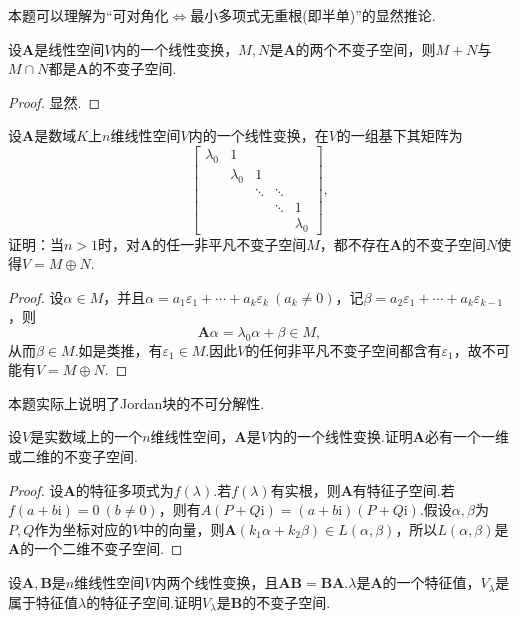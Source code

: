 \begin{note}
	本题可以理解为“可对角化$\Leftrightarrow$最小多项式无重根(即半单)”的显然推论.
\end{note}
\begin{prob}[15]
	设$\bm A$是线性空间$V$内的一个线性变换，$M,N$是$\bm A$的两个不变子空间，则$M+N$与$M\cap N$都是$\bm A$的不变子空间.
\end{prob}
\begin{proof}
	显然.
\end{proof}
\begin{prob}[16]
	设$\bm A$是数域$K$上$n$维线性空间$V$内的一个线性变换，在$V$的一组基下其矩阵为
	\[
		\begin{bmatrix}
			\lambda_0 & 1         &        &        &           \\
			          & \lambda_0 & 1      &        &           \\
			          &           & \ddots & \ddots &           \\
			          &           &        & \ddots & 1         \\
			          &           &        &        & \lambda_0
		\end{bmatrix},
	\]
	证明：当$n>1$时，对$\bm A$的任一非平凡不变子空间$M$，都不存在$\bm A$的不变子空间$N$使得$V=M\oplus N$.
\end{prob}
\begin{proof}
	设$\alpha\in M$，并且$\alpha=a_1\varepsilon_1+\cdots+a_k\varepsilon_k\ (a_k\ne0)$，记$\beta=a_2\varepsilon_1+\cdots+a_k\varepsilon_{k-1}$，则
	\[
		\bm A\alpha=\lambda_0\alpha+\beta\in M,
	\]
	从而$\beta\in M$.如是类推，有$\varepsilon_1\in M$.因此$V$的任何非平凡不变子空间都含有$\varepsilon_1$，故不可能有$V=M\oplus N$.
\end{proof}
\begin{note}
	本题实际上说明了Jordan块的不可分解性.
\end{note}
\begin{prob}[19]
	设$V$是实数域上的一个$n$维线性空间，$\bm A$是$V$内的一个线性变换.证明$\bm A$必有一个一维或二维的不变子空间.
\end{prob}
\begin{proof}
	设$\bm A$的特征多项式为$f(\lambda)$.若$f(\lambda)$有实根，则$\bm A$有特征子空间.若$f(a+b\mathrm{i})=0\ (b\ne0)$，则有$A(P+Q\mathrm{i})=(a+b\mathrm{i})(P+Q\mathrm{i})$.假设$\alpha,\beta$为$P,Q$作为坐标对应的$V$中的向量，则$\bm A(k_1\alpha+k_2\beta)\in L(\alpha,\beta)$，所以$L(\alpha,\beta)$是$\bm A$的一个二维不变子空间.
\end{proof}
\begin{prob}[20]
	设$\bm A,\bm B$是$n$维线性空间$V$内两个线性变换，且$\bm{AB}=\bm{BA}$.$\lambda$是$\bm A$的一个特征值，$V_\lambda$是属于特征值$\lambda$的特征子空间.证明$V_\lambda$是$\bm B$的不变子空间.
\end{prob}
